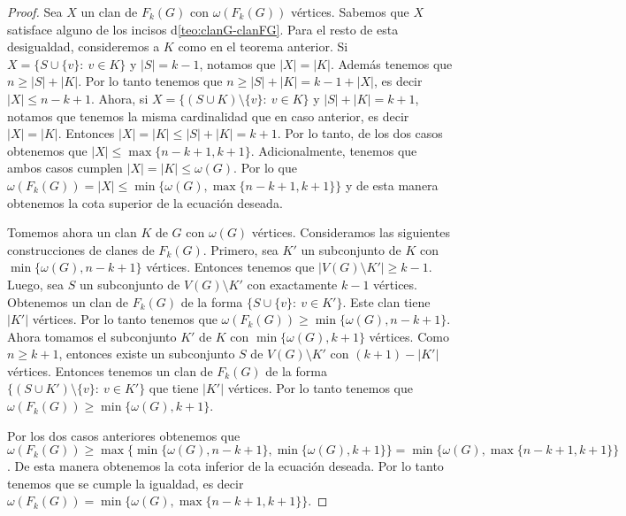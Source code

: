     \begin{proof}
        Sea $X$ un clan de $F_k(G)$ con $\omega(F_k(G))$ v\'ertices. Sabemos que
        $X$ satisface alguno de los incisos d\cref{teo:clanG-clanFG}. Para el
        resto de esta desigualdad, consideremos a $K$ como en el teorema
        anterior.   Si $X = \{S \cup \{v\} \colon\ v \in K\}$ y $|S| = k-1$,
        notamos que $|X| = |K|$. Adem\'as tenemos que $n \geq |S| + |K|$. Por lo
        tanto tenemos que $n \geq |S| + |K| = k-1 + |X|$, es decir $|X| \leq
        n-k+1$. Ahora, si $X = \{(S\cup K) \setminus \{v\} \colon\ v \in K \}$ y
        $|S| + |K| = k+1$, notamos que tenemos la misma cardinalidad que en caso
        anterior, es decir $|X| =|K|$. Entonces $|X| = |K| \leq |S| + |K| =
        k+1$. Por lo tanto, de los dos casos obtenemos que $|X| \leq
        \max\{n-k+1, k+1\}$. Adicionalmente, tenemos que ambos casos cumplen
        $|X| = |K| \leq \omega(G)$. Por lo que $\omega(F_k(G)) = |X| \leq \min
        \{\omega(G), \max \{n-k+1, k+1\}\}$ y de esta manera obtenemos la cota
        superior de la ecuaci\'on deseada.

        Tomemos ahora un clan $K$ de $G$ con $\omega(G)$ v\'ertices.
        Consideramos las siguientes construcciones de clanes de $F_k(G)$.
        Primero, sea $K'$ un subconjunto de $K$ con $\min\{\omega(G),n-k+1\}$
        v\'ertices. Entonces tenemos que $|V(G) \setminus K'| \geq k-1$. Luego,
        sea $S$ un subconjunto de $V(G) \setminus K'$ con exactamente $k-1$
        v\'ertices. Obtenemos un clan de $F_k(G)$ de la forma $\{ S \cup \{v\}
        \colon\ v \in K'\}$. Este clan tiene $|K'|$ v\'ertices. Por lo tanto
        tenemos que $\omega(F_k(G)) \geq \min \{\omega(G), n-k+1\}$. Ahora
        tomamos el subconjunto $K'$ de $K$ con $\min \{ \omega(G), k+1\}$
        v\'ertices. Como $n \geq k+1$, entonces existe un subconjunto $S$ de
        $V(G) \setminus K'$ con $(k+1)-|K'|$ v\'ertices. Entonces tenemos un
        clan de $F_k(G)$ de la forma $\{ (S \cup K') \setminus \{v\} \colon\ v
        \in K'\}$ que tiene $|K'|$ v\'ertices. Por lo tanto tenemos que
        $\omega(F_k(G)) \geq \min \{\omega(G), k+1\}$.

        Por los dos casos anteriores obtenemos que $\omega(F_k(G)) \geq \max
        \{\min \{\omega(G), n-k+1\}, \min \{\omega(G), k+1 \}\} = \min
        \{\omega(G), \max \{n-k+1,k+1\}\}$. De esta manera obtenemos la cota
        inferior de la ecuaci\'on deseada. Por lo tanto tenemos que se cumple la
        igualdad, es decir  $\omega(F_k(G))= \min \{\omega(G), \max
        \{n-k+1,k+1\}\}$.
    \end{proof}

